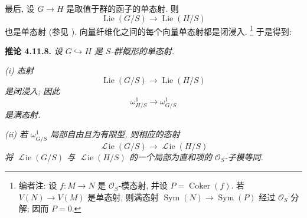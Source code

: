 最后, 设 \(G\to H\) 是取值于群的函子的单态射. 则
\[
 \operatorname{Lie}(G/S)\longrightarrow\operatorname{Lie}(H/S)
\]
也是单态射 (参见 ).
向量纤维化之间的每个向量单态射都是闭浸入.
\footnote{编者注: 设
\(f:M\to N\) 是 \(\mathcal O_S\)-模态射,
并设 \(P=\operatorname{Coker}(f)\). 若 \(V(N)\to V(M)\) 是单态射,
则满态射
\(\operatorname{Sym}(N)\to\operatorname{Sym}(P)\) 经过
\(\mathcal O_S\) 分解; 因而 \(P=0\).}
于是得到:

\medskip
\noindent{}\textbf{推论 4.11.8.}
\textit{设 \(G\hookrightarrow H\) 是 \(S\)-群概形的单态射.}

\textit{(i) 态射}
\[
 \operatorname{Lie}(G/S)\longrightarrow\operatorname{Lie}(H/S)
\]
\textit{是闭浸入; 因此}
\[
 \omega^1_{H/S}\longrightarrow\omega^1_{G/S}
\]
\textit{是满态射.}

\textit{(ii) 若 \(\omega^1_{G/S}\) 局部自由且为有限型,
则相应的态射}
\[
 \mathop{\mathscr L\!ie}(G/S)\longrightarrow
 \mathop{\mathscr L\!ie}(H/S)
\]
\textit{将 \(\mathop{\mathscr L\!ie}(G/S)\) 与
\(\mathop{\mathscr L\!ie}(H/S)\) 的一个局部为直和项的
\(\mathcal O_S\)-子模等同.}


